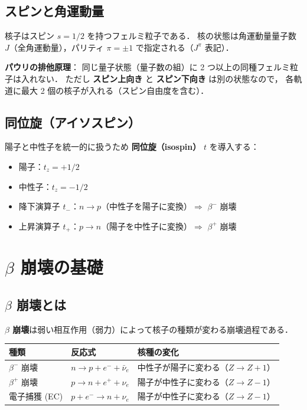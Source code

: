 \documentclass[12pt,a4paper]{ltjsarticle}
\begin{document}
\subsection{スピンと角運動量}

核子はスピン $s = 1/2$ を持つフェルミ粒子である．
核の状態は角運動量量子数 $J$（全角運動量），パリティ $\pi = \pm 1$ で指定される（$J^\pi$ 表記）．

\begin{point}
\textbf{パウリの排他原理}：
同じ量子状態（量子数の組）に 2 つ以上の同種フェルミ粒子は入れない．
ただし \textbf{スピン上向き} と \textbf{スピン下向き} は別の状態なので，
各軌道に最大 2 個の核子が入れる（スピン自由度を含む）．
\end{point}

\subsection{同位旋（アイソスピン）}

陽子と中性子を統一的に扱うため \textbf{同位旋（isospin）} $t$ を導入する：
\begin{itemize}
  \item 陽子：$t_z = +1/2$
  \item 中性子：$t_z = -1/2$
  \item 降下演算子 $t_-$：$n \to p$（中性子を陽子に変換）$\Rightarrow$ $\beta^-$ 崩壊
  \item 上昇演算子 $t_+$：$p \to n$（陽子を中性子に変換）$\Rightarrow$ $\beta^+$ 崩壊
\end{itemize}

\section{$\beta$ 崩壊の基礎}

\subsection{$\beta$ 崩壊とは}

\textbf{$\beta$ 崩壊}は弱い相互作用（弱力）によって核子の種類が変わる崩壊過程である．

\begin{center}
\begin{tabular}{lll}
\toprule
種類 & 反応式 & 核種の変化 \\
\midrule
$\beta^-$ 崩壊 & $n \to p + e^- + \bar{\nu}_e$ & 中性子が陽子に変わる（$Z \to Z+1$） \\
$\beta^+$ 崩壊 & $p \to n + e^+ + \nu_e$ & 陽子が中性子に変わる（$Z \to Z-1$） \\
電子捕獲 (EC) & $p + e^- \to n + \nu_e$ & 陽子が中性子に変わる（$Z \to Z-1$） \\
\bottomrule
\end{tabular}
\end{center}
\end{document}
